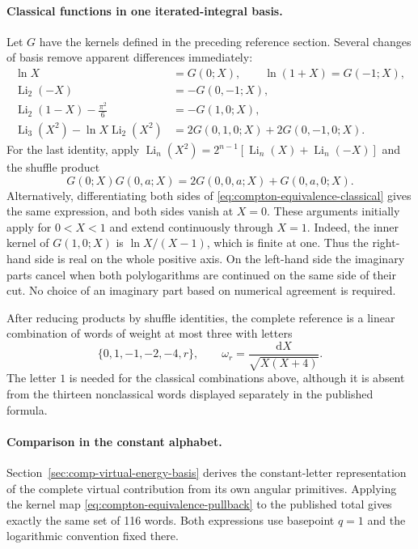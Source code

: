 \paragraph{Classical functions in one iterated-integral basis.}
Let $G$ have the kernels defined in the preceding reference section.
Several changes of basis remove apparent differences immediately:
\begin{align}
 \ln X&=G(0;X),\qquad \ln(1+X)=G(-1;X),\\
 \operatorname{Li}_2(-X)&=-G(0,-1;X),\\
 \operatorname{Li}_2(1-X)-\frac{\pi^2}{6}&=-G(1,0;X),\\
 \operatorname{Li}_3(X^2)-\ln X\operatorname{Li}_2(X^2)
 &=2G(0,1,0;X)+2G(0,-1,0;X).
 \label{eq:compton-equivalence-classical}
\end{align}
For the last identity, apply
$\operatorname{Li}_n(X^2)=2^{n-1}[\operatorname{Li}_n(X)+
\operatorname{Li}_n(-X)]$ and the shuffle product
\begin{equation}
 G(0;X)G(0,a;X)=2G(0,0,a;X)+G(0,a,0;X).
\end{equation}
Alternatively, differentiating both sides of
\eqref{eq:compton-equivalence-classical} gives the same expression, and
both sides vanish at $X=0$.  These arguments initially apply for
$0<X<1$ and extend continuously through $X=1$.  Indeed, the inner kernel
of $G(1,0;X)$ is $\ln X/(X-1)$, which is finite at one.  Thus the
right-hand side is real on the whole positive axis.  On the left-hand
side the imaginary parts cancel when both polylogarithms are continued
on the same side of their cut.  No choice of an imaginary part based on
numerical agreement is required.

After reducing products by shuffle identities, the complete reference
is a linear combination of words of weight at most three with letters
\begin{equation}
 \{0,1,-1,-2,-4,r\},\qquad
 \omega_{r}=\frac{\mathrm{d}X}{\sqrt{X(X+4)}}.
\end{equation}
The letter $1$ is needed for the classical combinations above, although
it is absent from the thirteen nonclassical words displayed separately
in the published formula.

\paragraph{Comparison in the constant alphabet.}
Section~\ref{sec:comp-virtual-energy-basis} derives the constant-letter
representation of the complete virtual contribution from its own
angular primitives. Applying the kernel map
\eqref{eq:compton-equivalence-pullback} to the published total gives
exactly the same set of 116 words. Both expressions use basepoint
$q=1$ and the logarithmic convention fixed there.

